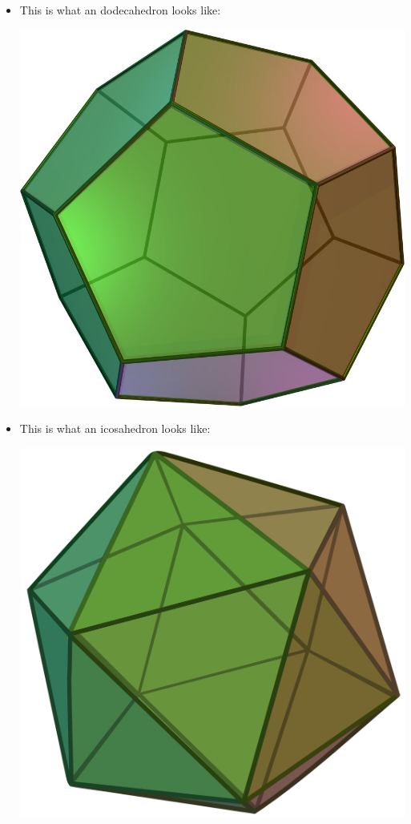 \documentclass[letterpaper]{article}
\begin{document}
\begin{itemize}
    \item This is what an dodecahedron looks like: 
    \begin{center}
        \includegraphics[scale=0.1]{assets/dodeca.jpg}
    \end{center}
    
    \item This is what an icosahedron looks like: 
    \begin{center}
        \includegraphics[scale=0.07]{assets/icosa.png}
    \end{center}
\end{itemize}
\end{document}
